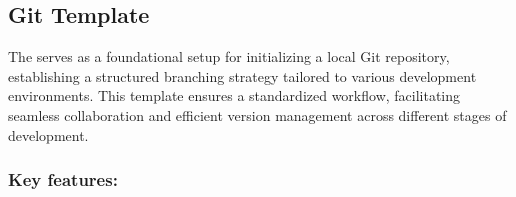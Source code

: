 \documentclass[letterpaper,10pt,english]{sphinxhowto}
\begin{document}
\sphinxstepscope


\subsection{Git Template}
\label{\detokenize{templates/git/index:git-template}}\label{\detokenize{templates/git/index::doc}}
\sphinxAtStartPar
The  serves as a foundational setup for initializing a local Git repository, establishing a structured branching strategy tailored to various development environments. This template ensures a standardized workflow, facilitating seamless collaboration and efficient version management across different stages of development.


\subsubsection{Key features:}
\end{document}
